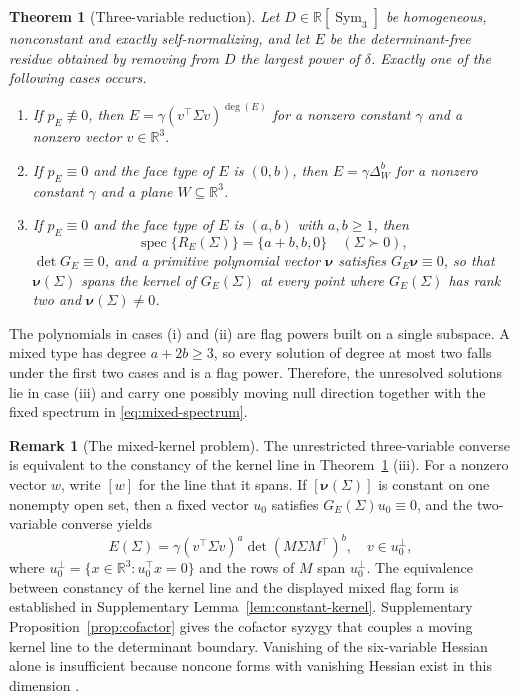 \documentclass[12pt,a4paper]{article}
\theoremstyle{plain}
\newtheorem{theorem}{Theorem}
\theoremstyle{definition}
\newtheorem{remark}{Remark}
\newcommand{\R}{\mathbb{R}}
\newcommand{\Sym}{\operatorname{Sym}}
\newcommand{\spec}{\operatorname{spec}}
\newcommand{\knu}{\boldsymbol{\nu}}
\begin{document}
\begin{theorem}[Three-variable reduction]
\label{thm:d3-reduction}
    Let $D\in\R[\Sym_3]$ be homogeneous, nonconstant and exactly self-normalizing, and let $E$ be the determinant-free residue obtained by removing from $D$ the largest power of $\delta$.
    Exactly one of the following cases occurs.
    \begin{enumerate}
        \item[(i)] If $p_E\not\equiv0$, then $E=\gamma(v^\top\Sigma v)^{\deg(E)}$ for a nonzero constant $\gamma$ and a nonzero vector $v\in\R^3$.
        \item[(ii)] If $p_E\equiv0$ and the face type of $E$ is $(0,b)$, then $E=\gamma\Delta_W^b$ for a nonzero constant $\gamma$ and a plane $W\subseteq\R^3$.
        \item[(iii)] If $p_E\equiv0$ and the face type of $E$ is $(a,b)$ with $a,b\ge1$, then
        \begin{equation}
        \label{eq:mixed-spectrum}
            \spec\{R_E(\Sigma)\}
            =
            \{a+b,b,0\}
            \quad
            (\Sigma\succ0)
            ,
        \end{equation}
        $\det G_E\equiv0$, and a primitive polynomial vector $\knu$ satisfies $G_E\knu\equiv0$, so that $\knu(\Sigma)$ spans the kernel of $G_E(\Sigma)$ at every point where $G_E(\Sigma)$ has rank two and $\knu(\Sigma)\ne 0$.
    \end{enumerate}
\end{theorem}
The polynomials in cases (i) and (ii) are flag powers built on a single subspace.
A mixed type has degree $a+2b\ge 3$, so every solution of degree at most two falls under the first two cases and is a flag power.
Therefore, the unresolved solutions lie in case (iii) and carry one possibly moving null direction together with the fixed spectrum in \eqref{eq:mixed-spectrum}.

\begin{remark}[The mixed-kernel problem]
\label{rem:mixed-kernel}
    The unrestricted three-variable converse is equivalent to the constancy of the kernel line in Theorem~\ref{thm:d3-reduction} (iii).
    For a nonzero vector $w$, write $[w]$ for the line that it spans.
    If $[\knu(\Sigma)]$ is constant on one nonempty open set, then a fixed vector $u_0$ satisfies $G_E(\Sigma)u_0\equiv0$, and the two-variable converse yields
    \begin{equation*}
        E(\Sigma)
        =
        \gamma(v^\top\Sigma v)^a
        \det(M\Sigma M^\top)^b
        ,
        \quad
        v\in u_0^\perp
        ,
    \end{equation*}
    where $u_0^\perp=\{x\in\R^3:u_0^\top x=0\}$ and the rows of $M$ span $u_0^\perp$.
    The equivalence between constancy of the kernel line and the displayed mixed flag form is established in Supplementary Lemma~\ref{lem:constant-kernel}.
    Supplementary Proposition~\ref{prop:cofactor} gives the cofactor syzygy that couples a moving kernel line to the determinant boundary.
    Vanishing of the six-variable Hessian alone is insufficient because noncone forms with vanishing Hessian exist in this dimension \citep{perazzo1900,ciliberto2008,gondimrusso2015}.
\end{remark}
\end{document}
